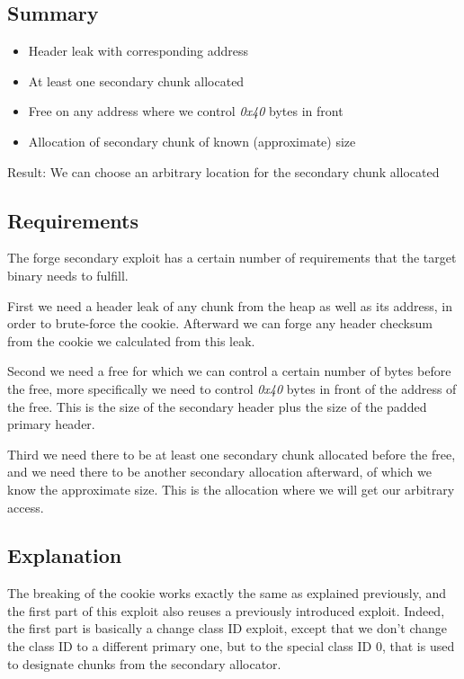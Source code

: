 \documentclass[a4paper,11pt,oneside]{report}
\begin{document}
\subsection{Summary}

\begin{itemize}
\item Header leak with corresponding address
\item At least one secondary chunk allocated
\item Free on any address where we control \emph{0x40} bytes in front
\item Allocation of secondary chunk of known (approximate) size
\end{itemize}

Result: We can choose an arbitrary location for the secondary chunk allocated

\subsection{Requirements}

The forge secondary exploit has a certain number of requirements that the target binary
needs to fulfill.

First we need a header leak of any chunk from the heap as well as its address, in
order to brute-force the cookie. Afterward we can forge any header checksum from the
cookie we calculated from this leak.

Second we need a free for which we can control a certain number of bytes before the free,
more specifically we need to control \emph{0x40} bytes in front of the address of the
free. This is the size of the secondary header plus the size of the padded primary header.

Third we need there to be at least one secondary chunk allocated before the free, and we
need there to be another secondary allocation afterward, of which we know the approximate
size. This is the allocation where we will get our arbitrary access.

\subsection{Explanation}

The breaking of the cookie works exactly the same as explained previously, and the first
part of this exploit also reuses a previously introduced exploit. Indeed, the first part is
basically a change class ID exploit, except that we don't change the class ID to a
different primary one, but to the special class ID 0, that is used to designate chunks
from the secondary allocator.
\end{document}
